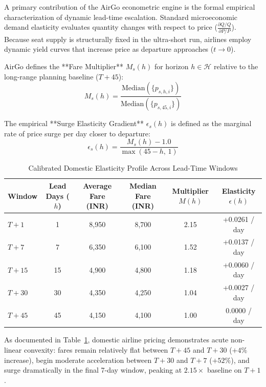 \documentclass[11pt,a4paper]{article}
\begin{document}
A primary contribution of the AirGo econometric engine is the formal empirical characterization of dynamic lead-time escalation. Standard microeconomic demand elasticity evaluates quantity changes with respect to price ($\frac{\partial Q / Q}{\partial P / P}$). Because seat supply is structurally fixed in the ultra-short run, airlines employ dynamic yield curves that increase price as departure approaches ($t \to 0$).

AirGo defines the **Fare Multiplier** $M_s(h)$ for horizon $h \in \mathcal{H}$ relative to the long-range planning baseline ($T+45$):
\begin{equation}
M_s(h) = \frac{\text{Median}\left(\{p_{s,h,i}\}\right)}{\text{Median}\left(\{p_{s,45,i}\}\right)}
\end{equation}

The empirical **Surge Elasticity Gradient** $\epsilon_s(h)$ is defined as the marginal rate of price surge per day closer to departure:
\begin{equation}
\label{eq:elasticity_gradient}
\epsilon_s(h) = \frac{M_s(h) - 1.0}{\max(45 - h, \, 1)}
\end{equation}

\begin{table}[htbp]
\centering
\caption{Calibrated Domestic Elasticity Profile Across Lead-Time Windows}
\label{tab:elasticity_results}
\begin{tabular}{lccccc}
\toprule
\textbf{Window} & \textbf{Lead Days ($h$)} & \textbf{Average Fare (INR)} & \textbf{Median Fare (INR)} & \textbf{Multiplier $M(h)$} & \textbf{Elasticity $\epsilon(h)$} \\
\midrule
$T+1$  & 1  & 8,950 & 8,700 & 2.15 & +0.0261 / day \\
$T+7$  & 7  & 6,350 & 6,100 & 1.52 & +0.0137 / day \\
$T+15$ & 15 & 4,900 & 4,800 & 1.18 & +0.0060 / day \\
$T+30$ & 30 & 4,350 & 4,250 & 1.04 & +0.0027 / day \\
$T+45$ & 45 & 4,150 & 4,100 & 1.00 & 0.0000 / day \\
\bottomrule
\end{tabular}
\end{table}

As documented in Table~\ref{tab:elasticity_results}, domestic airline pricing demonstrates acute non-linear convexity: fares remain relatively flat between $T+45$ and $T+30$ ($+4\%$ increase), begin moderate acceleration between $T+30$ and $T+7$ ($+52\%$), and surge dramatically in the final 7-day window, peaking at $2.15\times$ baseline on $T+1$.
\end{document}
